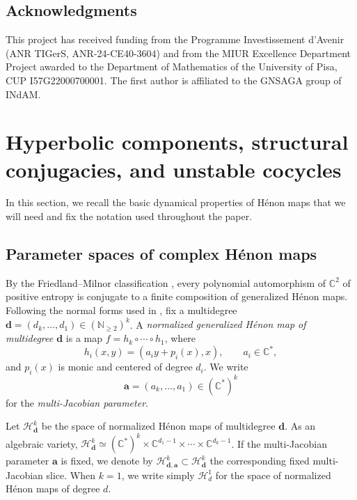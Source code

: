 \documentclass[11pt]{amsart}
\theoremstyle{plain}
\theoremstyle{definition}
\theoremstyle{remark}
\begin{document}
\subsection*{Acknowledgments}
This project has received funding from the Programme Investissement d'Avenir (ANR TIGerS, ANR-24-CE40-3604)
and
from the MIUR Excellence Department Project awarded to the Department of Mathematics of the University of Pisa, CUP I57G22000700001.
The first
author is affiliated to the GNSAGA group of INdAM.


\section{Hyperbolic components, structural conjugacies, and unstable cocycles}
\label{s:prelim}

In this section, we recall the basic dynamical properties of H\'enon maps that we will need and fix the notation used
throughout the paper. 


\subsection{Parameter spaces of complex H\'enon maps}
By the Friedland--Milnor classification
\cite{FriedlandMilnor89}, every polynomial automorphism of $\mathbb C^2$
of positive entropy
is conjugate to a finite composition of generalized
H\'enon maps.
Following the normal forms
used in \cite{CD26Henon}, fix a multidegree
$\mathbf d=(d_k,\ldots,d_1)\in(\mathbb N_{\ge 2})^k$.
A {\it normalized generalized H\'enon map of multidegree $\mathbf d$} is a
map
$f=h_k\circ\cdots\circ h_1$,
where
$$
h_i(x,y)=(a_i y+p_i(x),x),
\qquad a_i\in\mathbb C^\ast,
$$
and $p_i(x)$ is monic and centered of degree $d_i$. We write
$$
\mathbf a=(a_k,\ldots,a_1)\in(\mathbb C^\ast)^k
$$
for the {\it multi-Jacobian parameter}.

Let $\mathcal H^k_{\mathbf d}$
be the space of normalized H\'enon maps of multidegree $\mathbf d$.
As an algebraic variety,
$\mathcal H^k_{\mathbf d}
        \simeq
        (\mathbb C^\ast)^k
        \times
        \mathbb C^{d_1-1}
        \times\cdots\times
        \mathbb C^{d_k-1}$.
If the multi-Jacobian parameter $\mathbf a$ is fixed, we denote by
$\mathcal H^k_{\mathbf d,\mathbf a} \subset
\mathcal H^k_{\mathbf d}$
the corresponding fixed multi-Jacobian slice. When $k=1$, we write simply
$\mathcal H^1_d$
for the space of normalized H\'enon maps of degree $d$.
\end{document}
